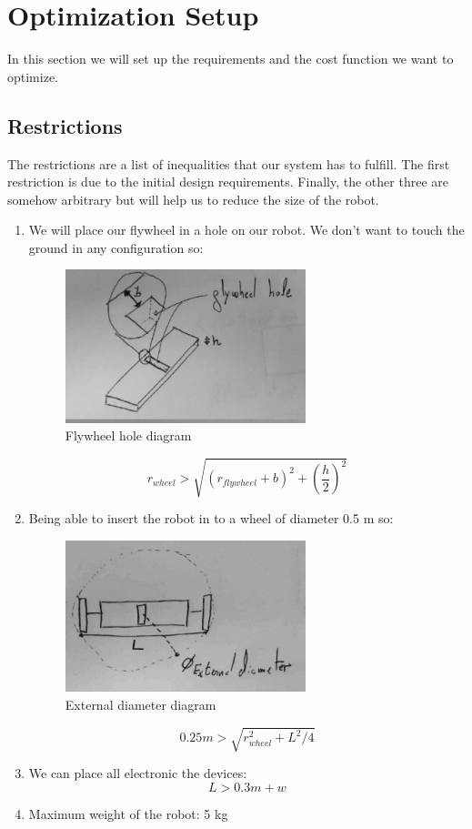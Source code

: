 \section{Optimization Setup}
In this section we will set up the requirements and the cost function we want to optimize.

\subsection{Restrictions}
The restrictions are a list of inequalities that our system has to fulfill.
The first restriction is due to the initial design requirements. Finally, the other three are 
somehow arbitrary but will help us to reduce the size of the robot.
\begin{enumerate}
\item We will place our flywheel in a hole on our robot. We don't want to touch the ground
in any configuration so:
\begin{figure}[ht]
	\centering
	\includegraphics[width=7cm]{img/flywheel_hole.jpg}
	\caption{Flywheel hole diagram}
	\label{fig:Flywheel hole diagram}
\end{figure}
\[r_{wheel}> \sqrt{(r_{flywheel} + b)^2+(\frac{h}{2})^2}\]
\item Being able  to insert the robot in to a wheel of diameter 0.5 m so:
\begin{figure}[ht]
	\centering
	\includegraphics[width=7cm]{img/external_diameter.jpg}
	\caption{External diameter diagram}
	\label{fig:External diameter diagram}
\end{figure}
\[0.25 m > \sqrt{r_{wheel}^2 + L^2/4}\]
\item We can place all electronic the devices:
\[L > 0.3m + w \]
\item Maximum weight of the robot: 5 kg
\end{enumerate}

